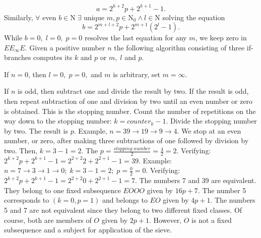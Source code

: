 \documentclass{article}
\begin{document}
\begin{displaymath}
a = 2^{k+2}p+2^{k+1}-1.
\end{displaymath}
Similarly, $\forall$ even $b \in \mathrm{N} \; \exists$ unique $m,p \in \mathrm{N_0} \wedge l \in \mathrm{N}$ solving the equation
\begin{displaymath}
b =  2^{m + l + 2}p + 2^{m+1}(2^l -1).
\end{displaymath}
While $b = 0, \; l = 0, \; p = 0$ resolves the last equation for any $m$, we keep zero in $EE_{\infty}E$. Given a positive number $n$ the following algorithm consisting of three if-branches computes its $k$ and $p$ or $m, \; l$ and $p$.

If $n = 0$, then $l = 0, \; p = 0,$ and $m$ is arbitrary, set $m = \infty$.

If $n$ is odd, then subtract one and divide the result by two. If the result is odd, then repeat subtraction of one and division by two until an even number or zero is obtained. This is the stopping number. Count the number of repetitions on the way down to the stopping number: $k = counter_k - 1$. Divide the stopping number by two. The result is $p$. Example, $n = 39 \to 19 \to 9 \to 4$. We stop at an even number, or zero, after making three subtractions of one followed by division by two. Then, $k = 3 - 1 = 2$. The $p = \frac{stopping \; number}{2} = \frac{4}{2} = 2$. Verifying:
$2^{k+2}p+2^{k+1}-1 = 2^{2+2}2+2^{2+1}-1 = 39$. Example: $n = 7 \to 3 \to 1 \to 0; \; k = 3 - 1 = 2; \; p = \frac{0}{2} = 0$. Verifying: $2^{k+2}p+2^{k+1}-1 = 2^{2+2}0+2^{2+1}-1 = 7$. The numbers 7 and 39 are equivalent. They belong to one fixed subsequence $EOOO$ given by $16p + 7$. The number 5 corresponds to $(k = 0, p = 1)$ and belongs to $EO$ given by $4p + 1$. The numbers 5 and 7 are not equivalent since they belong to two different fixed classes. Of course, both are members of $O$ given by $2p + 1$. However, $O$ is not a fixed subsequence and a subject for application of the sieve.
\end{document}
